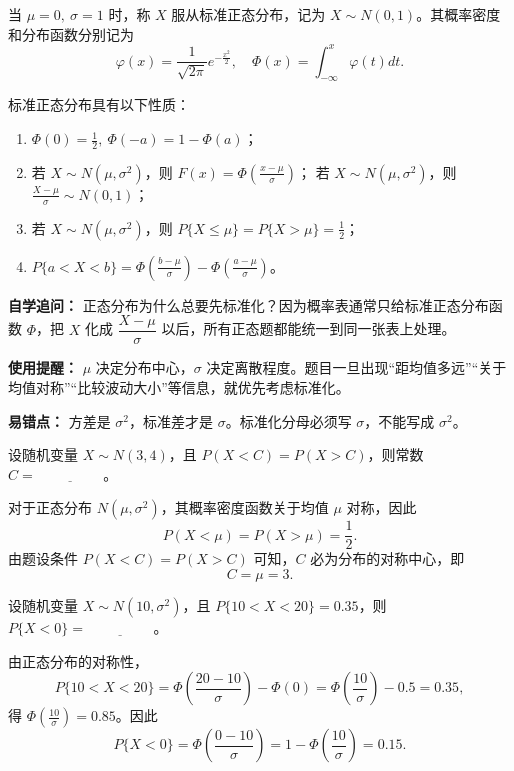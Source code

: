 ﻿\documentclass[lang=cn,11pt]{elegantbook}
\begin{document}
\begin{definition}[标准正态分布] \label{def:std-normal}
当 $\mu = 0,\ \sigma = 1$ 时，称 $X$ 服从标准正态分布，记为 $X \sim N(0,1)$。其概率密度和分布函数分别记为
\[
\varphi(x) = \frac{1}{\sqrt{2\pi}} e^{-\frac{x^2}{2}},\quad \Phi(x) = \int_{-\infty}^x \varphi(t) dt.
\]
\end{definition}

\begin{property}\label{prop:normal-properties}
标准正态分布具有以下性质：
\begin{enumerate}
    \item $\Phi(0) = \frac{1}{2},\ \Phi(-a) = 1 - \Phi(a)$；
    \item 若 $X \sim N(\mu,\sigma^2)$，则 $F(x) = \Phi\left(\frac{x-\mu}{\sigma}\right)$； 若 $X \sim N(\mu,\sigma^2)$，则 $\frac{X-\mu}{\sigma} \sim N(0,1)$；
    \item 若 $X \sim N(\mu,\sigma^2)$，则 $P\{X \le \mu\} = P\{X > \mu\} = \frac{1}{2}$；
    \item $P\{a < X < b\} = \Phi\left(\frac{b-\mu}{\sigma}\right) - \Phi\left(\frac{a-\mu}{\sigma}\right)$。
\end{enumerate}
\end{property}

\begin{note}
\textbf{自学追问：} 正态分布为什么总要先标准化？因为概率表通常只给标准正态分布函数 \(\Phi\)，把 \(X\) 化成 \(\dfrac{X-\mu}{\sigma}\) 以后，所有正态题都能统一到同一张表上处理。

\textbf{使用提醒：} \(\mu\) 决定分布中心，\(\sigma\) 决定离散程度。题目一旦出现“距均值多远”“关于均值对称”“比较波动大小”等信息，就优先考虑标准化。

\textbf{易错点：} 方差是 \(\sigma^2\)，标准差才是 \(\sigma\)。标准化分母必须写 \(\sigma\)，不能写成 \(\sigma^2\)。
\end{note}

\begin{exercise}[正态分布对称点] 
设随机变量 $X\sim N(3,4)$，且 $P(X<C)=P(X>C)$，则常数 $C=\underline{\hspace{2cm}}$。
\end{exercise}
\begin{solution}
对于正态分布 $N(\mu,\sigma^2)$，其概率密度函数关于均值 $\mu$ 对称，因此
\[
P(X<\mu)=P(X>\mu)=\frac{1}{2}.
\]
由题设条件 $P(X<C)=P(X>C)$ 可知，$C$ 必为分布的对称中心，即
\[
C=\mu=3.
\]
\end{solution}

\begin{exercise}
设随机变量 $X \sim N(10,\sigma^2)$，且 $P\{10 < X < 20\} = 0.35$，则 $P\{X < 0\} = \underline{\hspace{2cm}}$。
\end{exercise}
\begin{solution}
由正态分布的对称性，
\[
P\{10 < X < 20\} = \Phi\left(\frac{20-10}{\sigma}\right) - \Phi(0) = \Phi\left(\frac{10}{\sigma}\right) - 0.5 = 0.35,
\]
得 $\Phi\left(\frac{10}{\sigma}\right) = 0.85$。因此
\[
P\{X < 0\} = \Phi\left(\frac{0-10}{\sigma}\right) = 1 - \Phi\left(\frac{10}{\sigma}\right) = 0.15.
\]
\end{solution}
\end{document}
